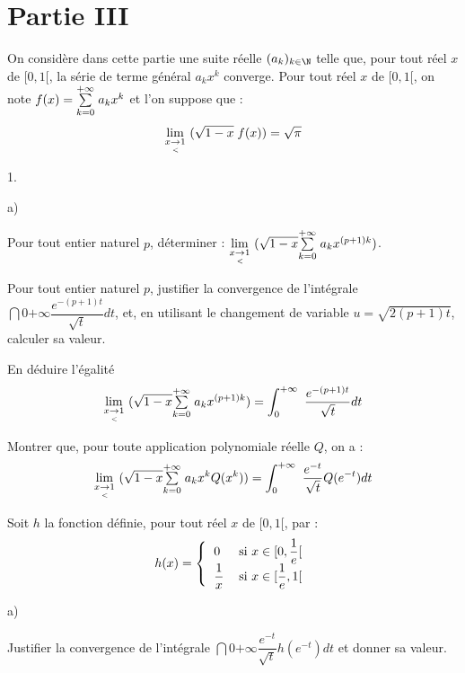\documentclass[11pt]{article}%
\begin{document}
\section*{Partie III}

On considère dans cette partie une suite réelle $(a_{k})_{k\in \N}$
telle que, pour tout réel $x$ de $[0,1[$, la série de terme général
$a_{k}x^{k}$ converge. Pour tout réel $x$ de $[0,1[$, on note $f(x) =
{\textstyle\sum\limits_{k = 0}^{+ \infty }}\hspace{.1cm}a_{k}x^{k}$ et l'on suppose que :
\[
{\displaystyle \lim_{x\underset{<}{\rightarrow }1} \ }(\sqrt{1-x}\;f(x)) = \sqrt{\pi }
\]

\begin{noliste}{1.}
 \setlength{\itemsep}{4mm}
\item 

\begin{noliste}{a)}
 \setlength{\itemsep}{2mm}
\item Pour tout entier naturel $p$, déterminer :
${\displaystyle \lim_{x\underset{<}{\rightarrow }1} \ }(\sqrt{1-x}{\textstyle\sum\limits_{k = 0}^{+ \infty
}}\hspace{.1cm}a_{k}x^{(p + 1)k})$.

\item Pour tout entier naturel $p$, justifier la convergence de
l'intégrale $\dint{0}{+ \infty }\dfrac{e^{-(p + 1)t}}{\sqrt{t}}dt$, et,
en utilisant
le changement de variable $u = \sqrt{2(p + 1)t}$, calculer sa valeur.

\item En déduire l'égalité 
\[
{\displaystyle \lim_{x\underset{<}{\rightarrow }1} \ }(\sqrt{1-x}{\textstyle\sum\limits_{k = 0}^{+ \infty
}}\hspace{.1cm}a_{k}x^{(p + 1)k}) = \displaystyle \int_{0}^{+ \infty }\ \dfrac{e^{-(p +
1)t}}{\sqrt{t}}dt
\]
\end{noliste}

\item Montrer que, pour toute application polynomiale réelle $Q$, on a
: 
\[
{\displaystyle \lim_{x\underset{<}{\rightarrow }1} \ }(\sqrt{1-x}{\textstyle\sum\limits_{k = 0}^{+ \infty
}}\hspace{.1cm}a_{k}x^{k}Q(x^{k})) = \displaystyle \int_{0}^{+ \infty
}\ \dfrac{e^{-t}}{\sqrt{t}}Q(e^{-t})dt
\]

\item Soit $h$ la fonction définie, pour tout réel $x$ de $[0,1[$, par
: 
\[
h(x) = \left\{ 
\begin{tabular}{ll}
$0$ & si $x\in \lbrack 0,\dfrac{1}{e}[$ \\
$\dfrac{1}{x}$ & si $x\in \lbrack \dfrac{1}{e},1[$\end{tabular}\right.
\]

\begin{noliste}{a)}
 \setlength{\itemsep}{2mm}
\item Justifier la convergence de l'intégrale $\dint{0}{+ \infty
}\dfrac{e^{-t}}{\sqrt{t}}h(e^{-t})dt$ et donner sa valeur.


\end{noliste}
\end{noliste}
\end{document}
